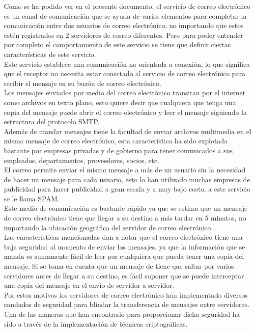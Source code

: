 \documentclass[12pt,oneside,onecolumn,openany]{report}
\begin{document}
Como se ha podido ver en el presente documento, el servicio de correo electrónico es un  canal  de  comunicación  que  se  ayuda  de  varios  elementos  para  completar  la 
comunicación  entre  dos  usuarios  de  correo  electrónico,  no  importando  que  estos  estén registrados en 2 servidores de correo diferentes. Pero 
para poder entender por completo el  comportamiento  de  este  servicio  se tiene  que  definir  ciertas  características  de  este servicio. 
\\
Este servicio establece una comunicación no orientada a conexión, lo que significa que el  receptor  no  necesita  estar  conectado  al  servicio  de  correo  electrónico  para  recibir  el mensaje en su buzón de correo electrónico. 
\\
Los mensajes enviados por medio del correo electrónico transitan por el   internet   como archivos  en  texto  plano,  esto  quiere  decir  que  cualquiera  que  tenga  una  copia  del 
mensaje puede abrir el correo            electrónico    y    leer    el    mensaje    siguiendo    la estructura del protocolo SMTP. 
\\
Además  de  mandar  mensajes  tiene  la  facultad  de  enviar  archivos  multimedia  en  el mismo mensaje de correo electrónico, esta característica ha sido explotada bastante por empresas   privadas   y   de   gobierno   para   tener   comunicados   a   sus empleados, departamentos, proveedores, socios, etc. 
\\
El  correo  permite  enviar  el  mismo  mensaje  a  más  de  un  usuario  sin  la  necesidad  de hacer un mensaje para cada usuario, esto lo han       utilizado     muchas     empresas     de 
publicidad para hacer publicidad a gran   escala y a muy bajo costo, a este servicio se le llama SPAM. 
\\
Este  medio  de  comunicación  es  bastante  rápido  ya  que  se  estima  que  un  mensaje  de correo  electrónico  tiene  que  llegar  a  su  destino  a  más  tardar  en  5  minutos,  no 
importando la ubicación geográfica del        servidor de correo electrónico. 
\\
Las características mencionadas  dan a notar que el correo electrónico tiene una baja seguridad al momento de enviar los mensajes, ya que la información que se manda es 
sumamente fácil de leer por cualquiera que pueda tener una copia del mensaje. Si se toma en cuenta que un mensaje de tiene que saltar 
por  varios  servidores  antes  de  llegar  a  su  destino,  es  fácil  suponer  que  se puede interceptar una copia del mensaje en el envío de servidor a servidor. 
\\
Por  estos  motivos  los  servidores  de  correo  electrónico  han implementado  diversos candados  de  seguridad  para  blindar  la  transferencia  de  mensajes  entre  servidores.  Una 
de  las  maneras  que  han  encontrado  para  proporcionar  dicha seguridad  ha  sido  a través de la implementación de técnicas criptográficas. 
\\
\end{document}
